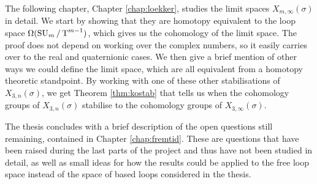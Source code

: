 The following chapter, Chapter \ref{chap:loekker}, studies the limit
spaces $X_{m,\infty}(\sigma)$ in detail. We start by showing that they
are homotopy equivalent to the loop space $\Omega(\operatorname{SU}_{m}/\operatorname{T}^{m-1})$, which
gives us the cohomology of the limit space. The proof does not depend
on working over the complex numbers, so it easily carries over to the
real and quaternionic cases. We then give a brief
mention of other ways we could define the limit space, which are all
equivalent from a homotopy theoretic standpoint. By working
with one of these other stabilisations of $X_{3,n}(\sigma)$, we get
Theorem \ref{thm:kostab}
that tells us when the cohomology groups of
$X_{3,n}(\sigma)$ stabilise to the cohomology groups of
$X_{3,\infty}(\sigma)$.

The thesis concludes with a brief description of the open questions
still remaining, contained in Chapter \ref{chap:fremtid}. These are
questions that have been raised during the last parts of the project
and thus have not been studied in detail, as well as small ideas for
how the results could be applied to the free loop space instead of
the space of based loops considered in the thesis.







